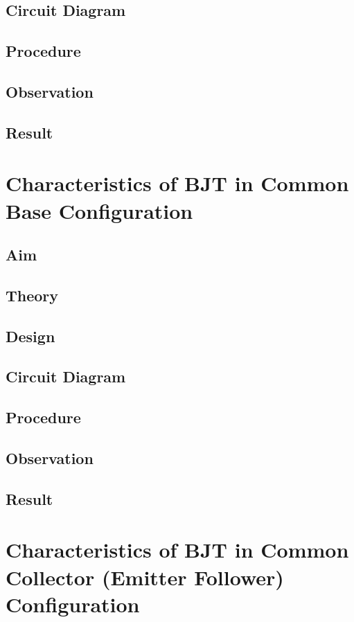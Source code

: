 \documentclass{book}
\begin{document}
\section*{Circuit Diagram}
\section*{Procedure}
\section*{Observation}
\section*{Result}


\chapter[Characteristics of BJT in Common Base Configuration]{Characteristics of BJT in Common Base Configuration}
\section*{Aim}
\section*{Theory}
\section*{Design}
\section*{Circuit Diagram}
\section*{Procedure}
\section*{Observation}
\section*{Result}
\chapter[Characteristics of BJT in Common Collector Configuration]{Characteristics of BJT in Common Collector (Emitter Follower) Configuration}
\end{document}
